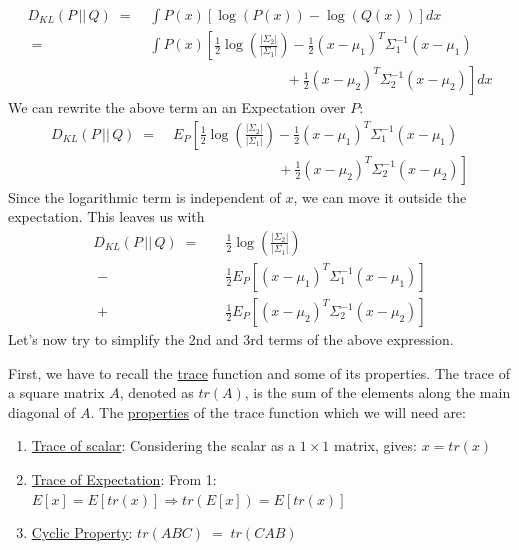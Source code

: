 \documentclass[12pt]{report}
\begin{document}
\begin{align*}
    D_{KL} (P \,||\, Q)
    \;=&\; \int P(x) \left[\log(P(x)) - \log(Q(x)) \right] dx\\
    \;=&\; \int P(x) \left[ \frac{1}{2}\log\left(\frac{|\Sigma_2|}{|\Sigma_1|}\right)
        - \frac{1}{2}(x-\mu_1)^T\Sigma_1^{-1} (x - \mu_1) \right. \\
       &\left.\qquad\qquad\qquad\qquad\quad\;\;\;\,
        + \frac{1}{2}(x-\mu_2)^T\Sigma_2^{-1} (x - \mu_2)\right] dx
\end{align*}
We can rewrite the above term an an Expectation over $P$:
\begin{align*}
    D_{KL} (P \,||\, Q)
    \;=&\; E_P \left[ \frac{1}{2}\log\left(\frac{|\Sigma_2|}{|\Sigma_1|}\right)
        - \frac{1}{2}(x-\mu_1)^T\Sigma_1^{-1} (x - \mu_1) \right. \\
       &\left.\qquad\qquad\qquad\quad\;\;\,
        + \frac{1}{2}(x-\mu_2)^T\Sigma_2^{-1} (x - \mu_2)\right]
\end{align*}
Since the logarithmic term is independent of $x$, we can move it outside the
expectation. This leaves us with
\begin{align}\label{eq:kld_exp}
    D_{KL} (P \,||\, Q)
    \;=\quad &\frac{1}{2}\log\left(\frac{|\Sigma_2|}{|\Sigma_1|}\right) \nonumber \\
       \; -\, &\frac{1}{2} E_P \left[ (x-\mu_1)^T\Sigma_1^{-1} (x - \mu_1) \right]
            \nonumber \\
       \; +\, &\frac{1}{2} E_P \left[ (x-\mu_2)^T\Sigma_2^{-1} (x - \mu_2) \right]
\end{align}
Let's now try to simplify the 2nd and 3rd terms of the above expression.
\bigskip

\noindent First, we have to recall the
\href{https://en.wikipedia.org/wiki/Trace_(linear_algebra)}{trace}
function and some of its properties. The trace of a square matrix $A$,
denoted as $tr(A)$, is the sum of the elements along the main diagonal of $A$.
The \href{https://en.wikipedia.org/wiki/Trace_(linear_algebra)#Properties}{properties}
of the trace function which we will need are:
\begin{enumerate}
    \item \href{https://math.stackexchange.com/questions/3098841/how-could-a-scalar-
        be-equal-to-the-trace-of-the-same-scalar}{Trace of scalar}:
        Considering the scalar as a $1\times1$ matrix, gives: $x = tr(x)$
    \item \href{https://math.stackexchange.com/questions/2228398/trace-trick-for-
        expectations-of-quadratic-forms}{Trace of Expectation}:
        From 1: $E[x] = E[tr(x)] \Rightarrow tr(E[x]) = E[tr(x)]$
    \item \href{https://en.wikipedia.org/wiki/Trace_(linear_algebra)#Cyclic_property}
        {Cyclic Property}: $tr(ABC) \;=\; tr(CAB)$
\end{enumerate}
\clearpage
\end{document}
